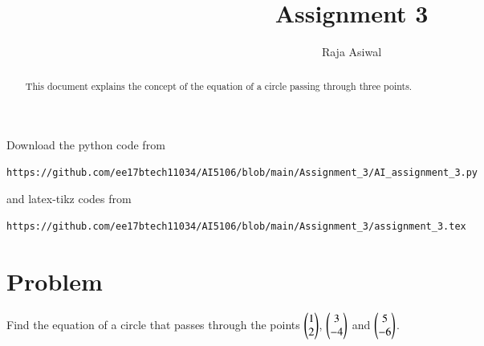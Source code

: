 \documentclass[journal,12pt,twocolumn]{IEEEtran}
\begin{document}
\renewcommand{\thefigure}{\theproblem}
\def\putbox#1#2#3{\makebox[0in][l]{\makebox[#1][l]{}\raisebox{\baselineskip}[0in][0in]{\raisebox{#2}[0in][0in]{#3}}}}
     \def\rightbox#1{\makebox[0in][r]{#1}}
     \def\centbox#1{\makebox[0in]{#1}}
     \def\topbox#1{\raisebox{-\baselineskip}[0in][0in]{#1}}
     \def\midbox#1{\raisebox{-0.5\baselineskip}[0in][0in]{#1}}
\vspace{3cm}
\title{Assignment 3}
\author{Raja Asiwal}
\maketitle
\newpage
\bigskip
\renewcommand{\thefigure}{\theenumi}
\renewcommand{\thetable}{\theenumi}
\begin{abstract}
This document explains the concept of the equation of a circle passing through three points.
\end{abstract}
Download the python code from 
%
\begin{lstlisting}
https://github.com/ee17btech11034/AI5106/blob/main/Assignment_3/AI_assignment_3.py
\end{lstlisting}
%
and latex-tikz codes from 
%
\begin{lstlisting}
https://github.com/ee17btech11034/AI5106/blob/main/Assignment_3/assignment_3.tex
\end{lstlisting}
%
\section{Problem}
\def\foo AA{$\myvec{1 \\2}$, $\myvec{3 \\-4}$ and $\myvec{5 \\ -6}$.}
Find the equation of a circle that passes through the points \foo AA
\end{document}
